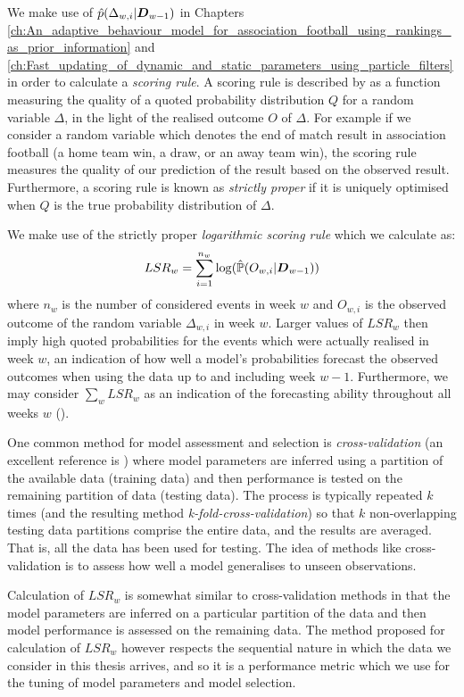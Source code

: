 We make use of \(\hat{p}(\Delta_{w, i} | \boldsymbol{D}_{w-1})\) in Chapters
\ref{ch:An_adaptive_behaviour_model_for_association_football_using_rankings_as_prior_information} and
\ref{ch:Fast_updating_of_dynamic_and_static_parameters_using_particle_filters} in order to calculate a \textit{scoring
rule}. A scoring rule is described by \cite{dawid2012} as a function measuring the quality of a quoted probability
distribution \(Q\) for a random variable \(\Delta\), in the light of the realised outcome \(O\) of \(\Delta\). For
example if we consider a random variable which denotes the end of match result in association football (a home team win,
a draw, or an away team win), the scoring rule measures the quality of our prediction of the result based on the
observed result. Furthermore, a scoring rule is known as \textit{strictly proper} if it is uniquely optimised when \(Q\)
is the true probability distribution of \(\Delta\).

We make use of the strictly proper \textit{logarithmic scoring rule} which we calculate as:
\begin{align}
LSR_w = \sum_{i=1}^{n_w} \log(\hat{\mathbb{P}}(O_{w, i} | \boldsymbol{D}_{w-1}))
\end{align}
where \(n_w\) is the number of considered events in week \(w\) and \(O_{w, i}\) is the observed outcome of the random
variable \(\Delta_{w, i}\) in week \(w\). Larger values of \(LSR_w\) then imply high quoted probabilities for the events
which were actually realised in week \(w\), an indication of how well a model's probabilities forecast the observed
outcomes when using the data up to and including week \(w-1\). Furthermore, we may consider \(\sum_w LSR_w\) as an
indication of the forecasting ability throughout all weeks \(w\) (\cite{gneiting2007}).

One common method for model assessment and selection is \textit{cross-validation} (an excellent reference is
\cite{hastie2009}) where model parameters are inferred using a partition of the available data (training data) and then
performance is tested on the remaining partition of data (testing data). The process is typically repeated \(k\) times
(and the resulting method \textit{k-fold-cross-validation}) so that \(k\) non-overlapping testing data partitions
comprise the entire data, and the results are averaged. That is, all the data has been used for testing. The idea of
methods like cross-validation is to assess how well a model generalises to unseen observations.

Calculation of \(LSR_w\) is somewhat similar to cross-validation methods in that the model parameters are inferred on a
particular partition of the data and then model performance is assessed on the remaining data. The method proposed for
calculation of \(LSR_w\) however respects the sequential nature in which the data we consider in this thesis arrives,
and so it is a performance metric which we use for the tuning of model parameters and model selection.

